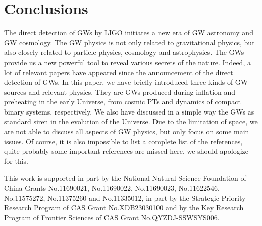 \documentclass[a4paper,11pt]{article}
\begin{document}
\section{Conclusions}
\label{sec:conclusion}

The direct detection of GWs by LIGO initiates a new era of GW astronomy and GW cosmology. The GW physics is not only related to gravitational physics, but also closely related to particle physics, cosmology and astrophysics. The GWs provide us a new powerful tool to reveal various secrets of the nature. Indeed, a lot of relevant papers have appeared since the announcement of the direct detection of GWs. In this paper, we have briefly introduced three kinds of GW sources and relevant physics. They are GWs produced during inflation and preheating in the early Universe, from cosmic PTs and dynamics of compact binary systems, respectively. We also have discussed in a simple way the GWs as standard siren in the evolution of the Universe. Due to the limitation of space, we are not able to discuss all aspects of GW physics, but only focus on some main issues. Of course, it is also impossible to list a complete list of the references, quite probably some important references are missed here, we should apologize for this.

\acknowledgments
This work is supported in part by the National Natural Science Foundation of China Grants No.11690021, No.11690022, No.11690023, No.11622546, No.11575272, No.11375260 and No.11335012, in part by the Strategic Priority Research Program of CAS Grant No.XDB23030100 and by the Key Research Program of Frontier Sciences of CAS Grant No.QYZDJ-SSWSYS006.




\end{document}
